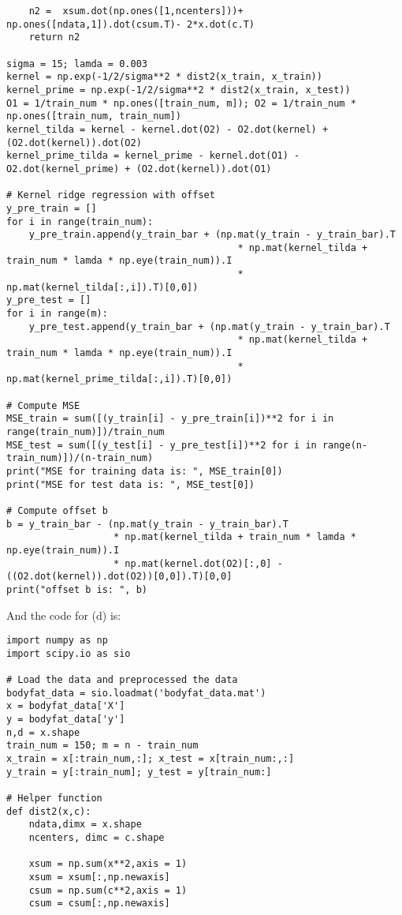\documentclass[letterpaper,11pt]{article}
\begin{document}
\begin{spacing}{1.2}
\begin{lstlisting}
    n2 =  xsum.dot(np.ones([1,ncenters]))+ np.ones([ndata,1]).dot(csum.T)- 2*x.dot(c.T)
    return n2

sigma = 15; lamda = 0.003
kernel = np.exp(-1/2/sigma**2 * dist2(x_train, x_train))
kernel_prime = np.exp(-1/2/sigma**2 * dist2(x_train, x_test))
O1 = 1/train_num * np.ones([train_num, m]); O2 = 1/train_num * np.ones([train_num, train_num])
kernel_tilda = kernel - kernel.dot(O2) - O2.dot(kernel) + (O2.dot(kernel)).dot(O2)
kernel_prime_tilda = kernel_prime - kernel.dot(O1) - O2.dot(kernel_prime) + (O2.dot(kernel)).dot(O1)

# Kernel ridge regression with offset
y_pre_train = []
for i in range(train_num):
    y_pre_train.append(y_train_bar + (np.mat(y_train - y_train_bar).T
                                         * np.mat(kernel_tilda + train_num * lamda * np.eye(train_num)).I
                                         * np.mat(kernel_tilda[:,i]).T)[0,0])
y_pre_test = []
for i in range(m):
    y_pre_test.append(y_train_bar + (np.mat(y_train - y_train_bar).T
                                         * np.mat(kernel_tilda + train_num * lamda * np.eye(train_num)).I
                                         * np.mat(kernel_prime_tilda[:,i]).T)[0,0])

# Compute MSE
MSE_train = sum([(y_train[i] - y_pre_train[i])**2 for i in range(train_num)])/train_num
MSE_test = sum([(y_test[i] - y_pre_test[i])**2 for i in range(n-train_num)])/(n-train_num)
print("MSE for training data is: ", MSE_train[0])
print("MSE for test data is: ", MSE_test[0])

# Compute offset b
b = y_train_bar - (np.mat(y_train - y_train_bar).T
                   * np.mat(kernel_tilda + train_num * lamda * np.eye(train_num)).I
                   * np.mat(kernel.dot(O2)[:,0] - ((O2.dot(kernel)).dot(O2))[0,0]).T)[0,0]
print("offset b is: ", b)
\end{lstlisting}

And the code for (d) is:
\begin{lstlisting}
import numpy as np
import scipy.io as sio

# Load the data and preprocessed the data
bodyfat_data = sio.loadmat('bodyfat_data.mat')
x = bodyfat_data['X']
y = bodyfat_data['y']
n,d = x.shape
train_num = 150; m = n - train_num
x_train = x[:train_num,:]; x_test = x[train_num:,:]
y_train = y[:train_num]; y_test = y[train_num:]

# Helper function
def dist2(x,c):
    ndata,dimx = x.shape
    ncenters, dimc = c.shape

    xsum = np.sum(x**2,axis = 1)
    xsum = xsum[:,np.newaxis]
    csum = np.sum(c**2,axis = 1)
    csum = csum[:,np.newaxis]


\end{lstlisting}
\end{spacing}
\end{document}
